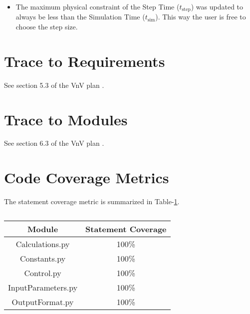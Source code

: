 \documentclass[12pt, titlepage]{article}
\begin{document}
\begin{itemize}

\item The maximum physical constraint of the  Step Time (${t_{\text{step}}}$) was 
updated to always be less than the Simulation Time (${t_{\text{sim}}}$). This way
the user is free to choose the step size.

\end {itemize}
		
\section{Trace to Requirements}

See section 5.3 of the VnV plan \cite{VnVPlan}.
		
\section{Trace to Modules}		

See section 6.3 of the VnV plan \cite{VnVPlan}.

\section{Code Coverage Metrics}

The statement coverage metric is summarized in Table-\ref{tab:statement-coverage}.

\begin{table}[]
\caption{}
\label{tab:statement-coverage}
\begin{tabular}{c|c}
Module             & Statement Coverage \\ \hline
Calculations.py    & 100\%              \\
Constants.py       & 100\%              \\
Control.py         & 100\%              \\
InputParameters.py & 100\%              \\
OutputFormat.py    & 100\%             
\end{tabular}
\end{table}



\end{document}
